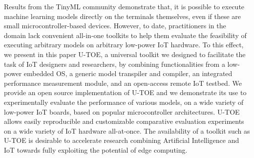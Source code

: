 Results from the TinyML community demonstrate that, it is possible to execute machine learning models directly on the terminals themselves, even if these are small microcontroller-based devices. However, to date, practitioners in the domain lack convenient all-in-one toolkits to help them evaluate the feasibility of executing arbitrary models on arbitrary low-power IoT hardware. To this effect, we present in this paper U-TOE, a universal toolkit we designed to facilitate the task of IoT designers and researchers, by combining functionalities from a low-power embedded OS, a generic model transpiler and compiler, an integrated performance measurement module, and an open-access remote IoT testbed. We provide an open source implementation of U-TOE and we demonstrate its use to experimentally evaluate the performance of various models, on a wide variety of low-power IoT boards, based on popular microcontroller architectures. U-TOE allows easily reproducible and customizable comparative evaluation experiments on a wide variety of IoT hardware all-at-once. The availability of a toolkit such as U-TOE is desirable to accelerate research combining Artificial Intelligence and IoT towards fully exploiting the potential of edge computing.